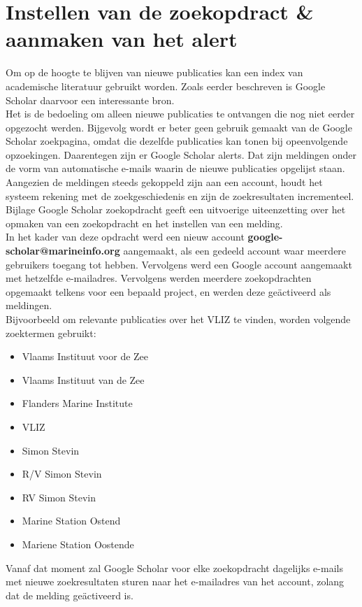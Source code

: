 \section{Instellen van de zoekopdract \& aanmaken van het alert}
Om op de hoogte te blijven van nieuwe publicaties kan een index van academische literatuur gebruikt worden. Zoals eerder beschreven is Google Scholar daarvoor een interessante bron.\\
Het is de bedoeling om alleen nieuwe publicaties te ontvangen die nog niet eerder opgezocht werden. Bijgevolg wordt er beter geen gebruik gemaakt van de Google Scholar zoekpagina, omdat die dezelfde publicaties kan tonen bij opeenvolgende opzoekingen. Daarentegen zijn er Google Scholar alerts. Dat zijn meldingen onder de vorm van automatische e-mails waarin de nieuwe publicaties opgelijst staan. Aangezien de meldingen steeds gekoppeld zijn aan een account, houdt het systeem rekening met de zoekgeschiedenis en zijn de zoekresultaten incrementeel.\\
Bijlage Google Scholar zoekopdracht geeft een uitvoerige uiteenzetting over het opmaken van een zoekopdracht en het instellen van een melding.\\
In het kader van deze opdracht werd een nieuw account \textbf{google-scholar@marineinfo.org} aangemaakt, als een gedeeld account waar meerdere gebruikers toegang tot hebben. Vervolgens werd een Google account aangemaakt met hetzelfde e-mailadres. Vervolgens werden meerdere zoekopdrachten opgemaakt telkens voor een bepaald project, en werden deze geäctiveerd als meldingen.\\
Bijvoorbeeld om relevante publicaties over het VLIZ te vinden, worden volgende zoektermen gebruikt:
\begin{itemize}
    \item Vlaams Instituut voor de Zee
    \item Vlaams Instituut van de Zee
    \item Flanders Marine Institute
    \item VLIZ
    \item Simon Stevin
    \item R/V Simon Stevin
    \item RV Simon Stevin
    \item Marine Station Ostend
    \item Mariene Station Oostende
\end{itemize}

Vanaf dat moment zal Google Scholar voor elke zoekopdracht dagelijks e-mails met nieuwe zoekresultaten sturen naar het e-mailadres van het account, zolang dat de melding geäctiveerd is.